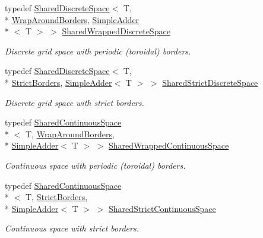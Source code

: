 \begin{DoxyCompactItemize}
\item 
typedef \hyperlink{classrepast_1_1_shared_discrete_space}{Shared\-Discrete\-Space}$<$ T, \\*
\hyperlink{classrepast_1_1_wrap_around_borders}{Wrap\-Around\-Borders}, \hyperlink{classrepast_1_1_simple_adder}{Simple\-Adder}\\*
$<$ T $>$ $>$ \hyperlink{structrepast_1_1_shared_spaces_a7e9474c0d17d53353b5e717986dd560f}{Shared\-Wrapped\-Discrete\-Space}
\begin{DoxyCompactList}\small\item\em Discrete grid space with periodic (toroidal) borders. \end{DoxyCompactList}\item 
typedef \hyperlink{classrepast_1_1_shared_discrete_space}{Shared\-Discrete\-Space}$<$ T, \\*
\hyperlink{classrepast_1_1_strict_borders}{Strict\-Borders}, \hyperlink{classrepast_1_1_simple_adder}{Simple\-Adder}$<$ T $>$ $>$ \hyperlink{structrepast_1_1_shared_spaces_ad248b97883d6310a57ce5c644eb8aa11}{Shared\-Strict\-Discrete\-Space}
\begin{DoxyCompactList}\small\item\em Discrete grid space with strict borders. \end{DoxyCompactList}\item 
typedef \hyperlink{classrepast_1_1_shared_continuous_space}{Shared\-Continuous\-Space}\\*
$<$ T, \hyperlink{classrepast_1_1_wrap_around_borders}{Wrap\-Around\-Borders}, \\*
\hyperlink{classrepast_1_1_simple_adder}{Simple\-Adder}$<$ T $>$ $>$ \hyperlink{structrepast_1_1_shared_spaces_a2c0b9c9945a0f170f744be9002ff5921}{Shared\-Wrapped\-Continuous\-Space}
\begin{DoxyCompactList}\small\item\em Continuous space with periodic (toroidal) borders. \end{DoxyCompactList}\item 
typedef \hyperlink{classrepast_1_1_shared_continuous_space}{Shared\-Continuous\-Space}\\*
$<$ T, \hyperlink{classrepast_1_1_strict_borders}{Strict\-Borders}, \\*
\hyperlink{classrepast_1_1_simple_adder}{Simple\-Adder}$<$ T $>$ $>$ \hyperlink{structrepast_1_1_shared_spaces_ada3e584944f724336e2a74d99af6fc55}{Shared\-Strict\-Continuous\-Space}
\begin{DoxyCompactList}\small\item\em Continuous space with strict borders. \end{DoxyCompactList}\end{DoxyCompactItemize}


